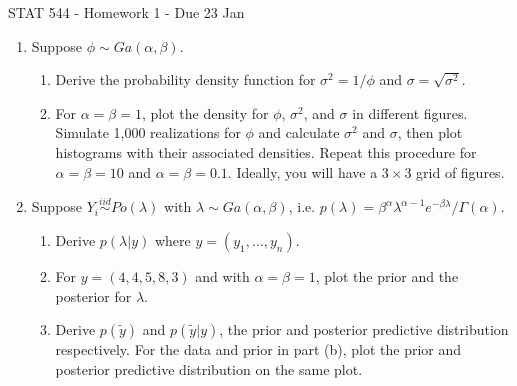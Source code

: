 \documentclass{article}
\begin{document}
STAT 544 - Homework 1 - Due 23 Jan


\begin{enumerate}
\item Suppose $\phi\sim Ga(\alpha,\beta)$. 
	\begin{enumerate}
	\item Derive the probability density function for $\sigma^2 = 1/\phi$ and $\sigma = \sqrt{\sigma^2}$. 
	\item For $\alpha=\beta=1$, plot the density for $\phi$, $\sigma^2$, and $\sigma$ in different figures. Simulate 1,000 realizations for $\phi$ and calculate $\sigma^2$ and $\sigma$, then plot histograms with their associated densities. Repeat this procedure for $\alpha=\beta=10$ and $\alpha=\beta=0.1$. Ideally, you will have a $3\times 3$ grid of figures.
	\end{enumerate}

\item Suppose $Y_i\stackrel{iid}{\sim} Po(\lambda)$ with $\lambda \sim Ga(\alpha,\beta)$, i.e. $p(\lambda) = \beta^{\alpha} \lambda^{\alpha-1}e^{-\beta \lambda}/\Gamma(\alpha)$.
	\begin{enumerate}
	\item Derive $p(\lambda|y)$ where $y=(y_1,\ldots,y_n)$. 
	\item For $y=(4, 4, 5, 8, 3)$ and with $\alpha=\beta=1$, plot the prior and the posterior for $\lambda$. 
	\item Derive $p(\tilde{y})$ and $p(\tilde{y}|y)$, the prior and posterior predictive distribution respectively. For the data and prior in part (b), plot the prior and posterior predictive distribution on the same plot. 
	\end{enumerate}

\end{enumerate}
\end{document}
